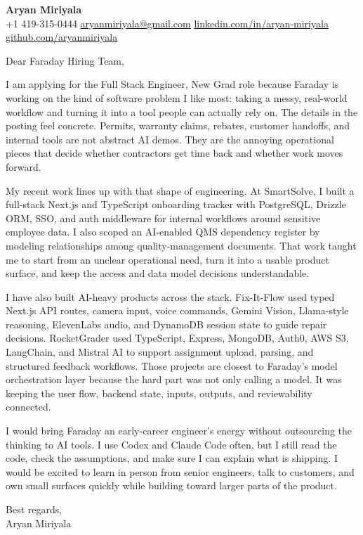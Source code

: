 \documentclass[letterpaper,11pt]{article}
\begin{document}
\begin{center}
    {\Large \textbf{Aryan Miriyala}}\\
    \vspace{2pt}
    +1 419-315-0444 \textbar{} \href{mailto:aryanmiriyala@gmail.com}{aryanmiriyala@gmail.com} \textbar{} \href{https://www.linkedin.com/in/aryan-miriyala-7788a21b6/}{linkedin.com/in/aryan-miriyala} \textbar{} \href{https://github.com/aryanmiriyala}{github.com/aryanmiriyala}
\end{center}

\vspace{10pt}

Dear Faraday Hiring Team,

I am applying for the Full Stack Engineer, New Grad role because Faraday is working on the kind of software problem I like most: taking a messy, real-world workflow and turning it into a tool people can actually rely on. The details in the posting feel concrete. Permits, warranty claims, rebates, customer handoffs, and internal tools are not abstract AI demos. They are the annoying operational pieces that decide whether contractors get time back and whether work moves forward.

My recent work lines up with that shape of engineering. At SmartSolve, I built a full-stack Next.js and TypeScript onboarding tracker with PostgreSQL, Drizzle ORM, SSO, and auth middleware for internal workflows around sensitive employee data. I also scoped an AI-enabled QMS dependency register by modeling relationships among quality-management documents. That work taught me to start from an unclear operational need, turn it into a usable product surface, and keep the access and data model decisions understandable.

I have also built AI-heavy products across the stack. Fix-It-Flow used typed Next.js API routes, camera input, voice commands, Gemini Vision, Llama-style reasoning, ElevenLabs audio, and DynamoDB session state to guide repair decisions. RocketGrader used TypeScript, Express, MongoDB, Auth0, AWS S3, LangChain, and Mistral AI to support assignment upload, parsing, and structured feedback workflows. Those projects are closest to Faraday's model orchestration layer because the hard part was not only calling a model. It was keeping the user flow, backend state, inputs, outputs, and reviewability connected.

I would bring Faraday an early-career engineer's energy without outsourcing the thinking to AI tools. I use Codex and Claude Code often, but I still read the code, check the assumptions, and make sure I can explain what is shipping. I would be excited to learn in person from senior engineers, talk to customers, and own small surfaces quickly while building toward larger parts of the product.

\vspace{8pt}

Best regards,\\
Aryan Miriyala
\end{document}
